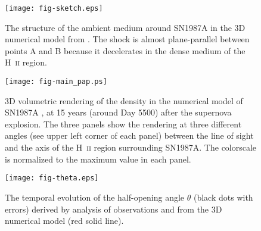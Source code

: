 \documentclass{aa}
\begin{document}
\begin{figure}
 \centering
 \texttt{[image: fig-sketch.eps]}
 \caption{The structure of the ambient medium around SN1987A in the 3D numerical model from \citet{orlando-etal-2015}. The shock is almost plane-parallel between points A and B because it decelerates in the dense medium of the H~\textsc{ii} region.
               }
 \label{alpha:figsxema}
\end{figure}
\begin{figure*}
 \centering
 \texttt{[image: fig-main\_pap.ps]}
 \caption{3D volumetric rendering of the density in the numerical model of SN1987A \citet{orlando-etal-2015}, at 15 years (around Day 5500) after the supernova explosion. The three panels show the rendering at three different angles (see upper left corner of each panel) between the line of sight and the axis of the H~\textsc{ii} region surrounding SN1987A. The colorscale is normalized to the maximum value in each panel.
               }
 \label{alpha:fig3D}
\end{figure*}
\begin{figure}
 \centering
 \texttt{[image: fig-theta.eps]}
 \caption{The temporal evolution of the half-opening angle $\theta$ (black dots with errors) derived by analysis of observations \citep{ng-etal-2013} and from the 3D numerical model \citep{orlando-etal-2015} (red solid line). 
               }
 \label{alpha:figtheta}
\end{figure}
\end{document}
